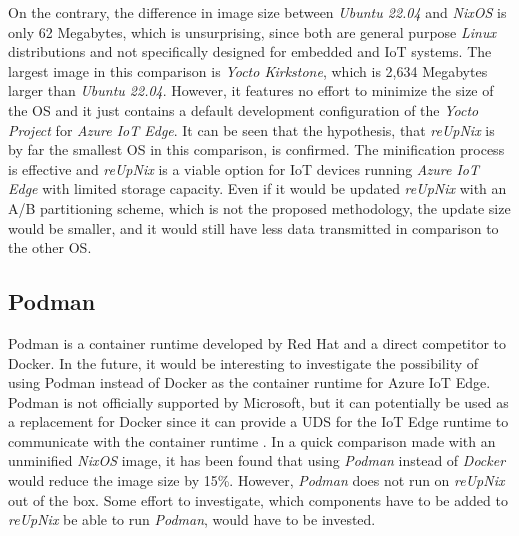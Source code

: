 \noindent
On the contrary, the difference in image size between \textit{Ubuntu 22.04} and
\textit{NixOS} is only 62 Megabytes, which is unsurprising, since both are
general purpose \textit{Linux} distributions and not specifically designed
for embedded and \ac{IoT} systems. The largest image in this comparison is
\textit{Yocto Kirkstone}, which is 2,634 Megabytes larger than \textit{Ubuntu 22.04}.
However, it features no effort to minimize the size of the \ac{OS} and it
just contains a default development configuration of the \textit{Yocto Project}
for \textit{Azure IoT Edge}. It can be seen that the hypothesis, that \textit{reUpNix}
is by far the smallest \ac{OS} in this comparison, is confirmed. The minification
process is effective and \textit{reUpNix} is a viable option for \ac{IoT} devices
running \textit{Azure IoT Edge} with limited storage capacity. Even if it would be
updated \textit{reUpNix} with an A/B partitioning scheme, which is not the proposed
methodology, the update size would be smaller, and it would still have less data
transmitted in comparison to the other \ac{OS}.

\subsection{Podman}
\label{sec:podman}
Podman is a container runtime developed by Red Hat and a direct competitor to Docker.
In the future, it would be interesting to investigate the possibility of using
Podman instead of Docker as the container runtime for Azure IoT Edge. Podman is
not officially supported by Microsoft, but it can potentially be used as a
replacement for Docker since it can provide a \ac{UDS} for the IoT Edge runtime
to communicate with the container runtime \cite{book:3556946,msdoc-supportetplatforms}.
In a quick comparison made with an unminified \textit{NixOS} image, it has been found that
using \textit{Podman} instead of \textit{Docker} would reduce the image size by
15\%. However, \textit{Podman} does not run on \textit{reUpNix} out of the box.
Some effort to investigate, which components have to be
added to \textit{reUpNix} be able to run \textit{Podman}, would have to be invested.

